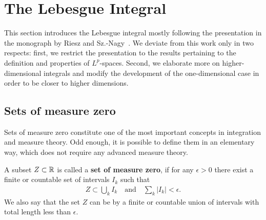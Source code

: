
\section{The Lebesgue Integral}
\label{sec:lebesgue-integral}
\begin{intro}
  This section introduces the Lebesgue integral mostly following the
  presentation in the monograph by Riesz and
  Sz.-Nagy~\cite{RieszNagy}. We deviate from this work only in two
  respects: first, we restrict the presentation to the results
  pertaining to the definition and properties of $L^p$-spaces. Second,
  we elaborate more on higher-dimensional integrals and modify the
  development of the one-dimensional case in order to be closer to
  higher dimensions.
\end{intro}

\subsection{Sets of measure zero}

\begin{intro}
  Sets of measure zero constitute one of the most important concepts
  in integration and measure theory. Odd enough, it is possible to
  define them in an elementary way, which does not require any
  advanced measure theory.
\end{intro}

\begin{definition}
  \label{def:zero-set-1}
  A subset $Z\subset \mathbb R$ is called a \textbf{set of measure zero}, if
  for any $\epsilon > 0$ there exist a finite or countable set of
  intervals $I_{k}$ such that
  \begin{gather*}
    Z \subset \bigcup_k I_{k}
    \quad\text{and}\quad
    \sum_k |I_{k}| < \epsilon.
  \end{gather*}
  We also say that the set $Z$ can be  by a finite or
  countable union of intervals with total length less than $\epsilon$.
\end{definition}

